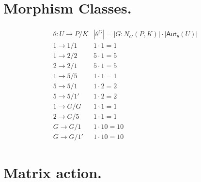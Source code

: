 \documentclass[12pt,a4paper]{amsart}
\begin{document}
\section*{Morphism Classes.}

\newcommand{\Aut}{\mathsf{Aut}}

\begin{align*}
  \begin{array}{cr}
    \theta\colon U \to P/K & |\theta^G| = |G : N_G(P, K) | \cdot |\Aut_{\theta}(U)| \\ \hline
    1 \to 1/1 & 1 \cdot 1 = 1 \\ \hline
    1 \to 2/2 & 5 \cdot 1 = 5 \\
    2 \to 2/1 & 5 \cdot 1 = 5\\ \hline
    1 \to 5/5 & 1 \cdot 1 = 1 \\
    5 \to 5/1 & 1 \cdot 2 = 2 \\
    5 \to 5/1' & 1 \cdot 2 = 2 \\ \hline
    1 \to G/G & 1 \cdot 1 = 1 \\
    2 \to G/5 & 1 \cdot 1 = 1\\
    G \to G/1 & 1 \cdot 10  = 10\\
    G \to G/1' & 1 \cdot 10 = 10
  \end{array}
\end{align*}

\section*{Matrix action.}
\end{document}
